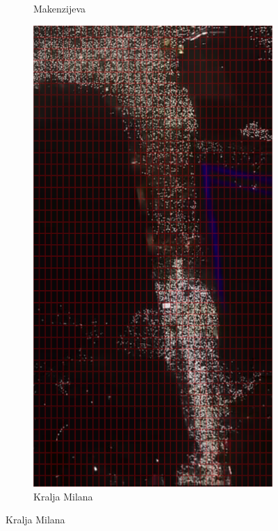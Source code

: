 \documentclass[a4paper,12pt]{article}
\begin{document}
\begin{figure}[H]
\begin{subfigure}[b]{0.3\textwidth}
	  \caption{Makenzijeva}
	  \label{fig:makenzijeva}
	\end{subfigure}
	\hfill
	\begin{subfigure}[b]{0.3\textwidth}
	  \centering
	  \includegraphics[width=\textwidth]{../grid_output/kralja-milana_grid.png}
	  \caption{Kralja Milana}
	  \label{fig:kralja-milana}

\end{subfigure}
\end{figure}
\end{document}

